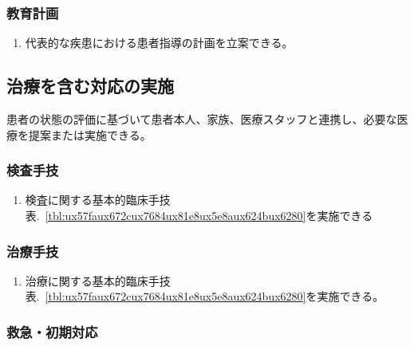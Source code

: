 \documentclass[
]{ltjsarticle}
\providecommand{\tightlist}{%
  \setlength{\itemsep}{0pt}\setlength{\parskip}{0pt}}
\begin{document}
\hypertarget{ux6559ux80b2ux8a08ux753b}{%
\subsubsection{教育計画}\label{ux6559ux80b2ux8a08ux753b}}

\begin{enumerate}
\def\labelenumi{\arabic{enumi}.}
\tightlist
\item
  代表的な疾患における患者指導の計画を立案できる。
\end{enumerate}

\hypertarget{ux6cbbux7642ux3092ux542bux3080ux5bfeux5fdcux306eux5b9fux65bd}{%
\subsection{治療を含む対応の実施}\label{ux6cbbux7642ux3092ux542bux3080ux5bfeux5fdcux306eux5b9fux65bd}}

患者の状態の評価に基づいて患者本人、家族、医療スタッフと連携し、必要な医療を提案または実施できる。

\hypertarget{ux691cux67fbux624bux6280}{%
\subsubsection{検査手技}\label{ux691cux67fbux624bux6280}}

\begin{enumerate}
\def\labelenumi{\arabic{enumi}.}
\tightlist
\item
  検査に関する基本的臨床手技表.~\ref{tbl:ux57faux672cux7684ux81e8ux5e8aux624bux6280}を実施できる
\end{enumerate}

\hypertarget{ux6cbbux7642ux624bux6280}{%
\subsubsection{治療手技}\label{ux6cbbux7642ux624bux6280}}

\begin{enumerate}
\def\labelenumi{\arabic{enumi}.}
\tightlist
\item
  治療に関する基本的臨床手技表.~\ref{tbl:ux57faux672cux7684ux81e8ux5e8aux624bux6280}を実施できる。
\end{enumerate}

\hypertarget{ux6551ux6025ux521dux671fux5bfeux5fdc}{%
\subsubsection{救急・初期対応}\label{ux6551ux6025ux521dux671fux5bfeux5fdc}}
\end{document}
